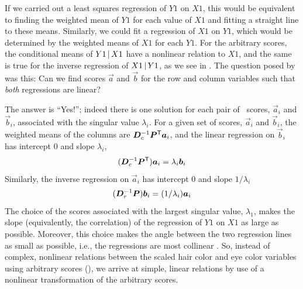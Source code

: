 If we carried out a least squares regression of  $Y1$ on $X1$,
this would be equivalent to finding the weighted mean of  $Y1$ for each value of $X1$ and fitting a straight line to these means.
Similarly, we could fit a regression of $X1$ on $Y1$,  which would be
determined by the weighted means of $X1$ for each $Y1$.
For the arbitrary scores, the conditional means of $Y1\, | \, X1$
have a nonlinear relation to $X1$, and the same is true for the
inverse regression of $X1\, | \, Y1$, as we see in .
The question posed by \citet{Hirschfeld:35} was this:
Can we find scores $\vec{a}$ and $\vec{b}$ for the row and column
variables such that \emph{both} regressions are linear?

The answer is ``Yes!''; indeed there is one solution for each pair of
\CA\ scores, $\vec{a}_i$ and $\vec{b}_i$, associated with the singular value $\lambda_i$.
For a given set of scores, $\vec{a}_i$ and $\vec{b}_i$, the weighted means
of the columns are
\(\bm{D}_c^{-1} \bm{P} ^\mathsf{T} \bm{a}_i \), and the linear regression on
$\vec{b}_i$ has intercept 0 and slope $\lambda_i$,
\begin{equation*}%
(\mat{D}_c^{-1} \mat{P} \trans) \vec{a}_i = \lambda_i \vec{b}_i
\end{equation*}
Similarly, the inverse regression on $\vec{a}_i$ has intercept 0 and slope $1/\lambda_i$
\begin{equation*}%
(\mat{D}_r^{-1} \mat{P}) \vec{b}_i = (1/\lambda_i) \vec{a}_i
\end{equation*}
The choice of the scores associated with the largest singular value,
$\lambda_1$, makes the slope (equivalently, the correlation) of the
regression of $Y1$ on $X1$ as large as possible.
Moreover, this choice makes the angle between the two regression lines
as small as possible, i.e., the regressions are most collinear
\citep{Greenacre:84}.
So, instead of complex, nonlinear relations between the scaled
hair color and eye color variables using arbitrary scores (),
we arrive at simple, linear relations by use of a nonlinear
transformation of the arbitrary scores.

